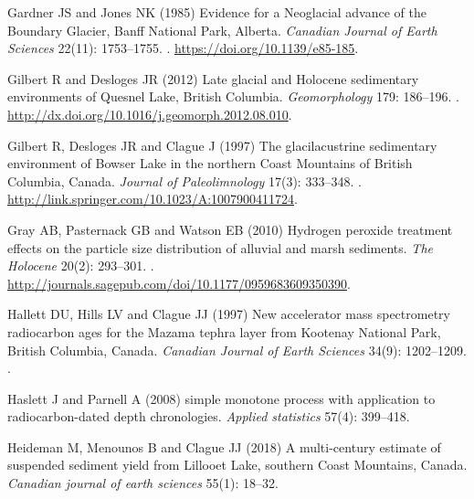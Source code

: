 \documentclass[Royal,times,doublespace,sageh]{sagej}
\begin{document}
\begin{thebibliography}{68}
Gardner JS and Jones NK (1985) {Evidence for a Neoglacial advance of the
  Boundary Glacier, Banff National Park, Alberta}.
\newblock \emph{Canadian Journal of Earth Sciences} 22(11): 1753--1755.
\newblock {}.
\newblock \urlprefix\url{https://doi.org/10.1139/e85-185}.

Gilbert R and Desloges JR (2012) {Late glacial and Holocene sedimentary
  environments of Quesnel Lake, British Columbia}.
\newblock \emph{Geomorphology} 179: 186--196.
\newblock {}.
\newblock \urlprefix\url{http://dx.doi.org/10.1016/j.geomorph.2012.08.010}.

Gilbert R, Desloges JR and Clague J (1997) {The glacilacustrine sedimentary
  environment of Bowser Lake in the northern Coast Mountains of British
  Columbia, Canada}.
\newblock \emph{Journal of Paleolimnology} 17(3): 333--348.
\newblock {}.
\newblock \urlprefix\url{http://link.springer.com/10.1023/A:1007900411724}.

Gray AB, Pasternack GB and Watson EB (2010) {Hydrogen peroxide treatment
  effects on the particle size distribution of alluvial and marsh sediments}.
\newblock \emph{The Holocene} 20(2): 293--301.
\newblock {}.
\newblock
  \urlprefix\url{http://journals.sagepub.com/doi/10.1177/0959683609350390}.

Hallett DU, Hills LV and Clague JJ (1997) {New accelerator mass spectrometry
  radiocarbon ages for the Mazama tephra layer from Kootenay National Park,
  British Columbia, Canada}.
\newblock \emph{Canadian Journal of Earth Sciences} 34(9): 1202--1209.
\newblock {}.

Haslett J and Parnell A (2008) simple monotone process with application to
  radiocarbon-dated depth chronologies.
\newblock \emph{Applied statistics} 57(4): 399--418.

Heideman M, Menounos B and Clague JJ (2018) {A multi-century estimate of
  suspended sediment yield from Lillooet Lake, southern Coast Mountains,
  Canada}.
\newblock \emph{Canadian journal of earth sciences} 55(1): 18--32.


\end{thebibliography}
\end{document}
